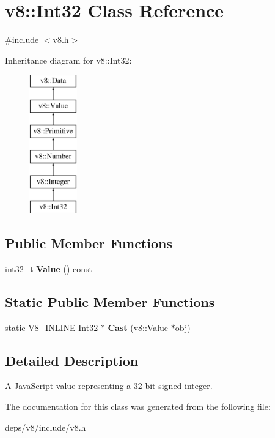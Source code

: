 \hypertarget{classv8_1_1_int32}{}\section{v8\+:\+:Int32 Class Reference}
\label{classv8_1_1_int32}


{\ttfamily \#include $<$v8.\+h$>$}

Inheritance diagram for v8\+:\+:Int32\+:\begin{figure}[H]
\begin{center}
\leavevmode
\includegraphics[height=6.000000cm]{classv8_1_1_int32}
\end{center}
\end{figure}
\subsection*{Public Member Functions}
\begin{DoxyCompactItemize}
\item 
\hypertarget{classv8_1_1_int32_a74860c6a524e1fb3f7b685ab0896be4b}{}int32\+\_\+t {\bfseries Value} () const \label{classv8_1_1_int32_a74860c6a524e1fb3f7b685ab0896be4b}

\end{DoxyCompactItemize}
\subsection*{Static Public Member Functions}
\begin{DoxyCompactItemize}
\item 
\hypertarget{classv8_1_1_int32_a910c59c30a7f5f3c96afd0ba10d5339b}{}static V8\+\_\+\+I\+N\+L\+I\+N\+E \hyperlink{classv8_1_1_int32}{Int32} $\ast$ {\bfseries Cast} (\hyperlink{classv8_1_1_value}{v8\+::\+Value} $\ast$obj)\label{classv8_1_1_int32_a910c59c30a7f5f3c96afd0ba10d5339b}

\end{DoxyCompactItemize}


\subsection{Detailed Description}
A Java\+Script value representing a 32-\/bit signed integer. 

The documentation for this class was generated from the following file\+:\begin{DoxyCompactItemize}
\item 
deps/v8/include/v8.\+h\end{DoxyCompactItemize}
